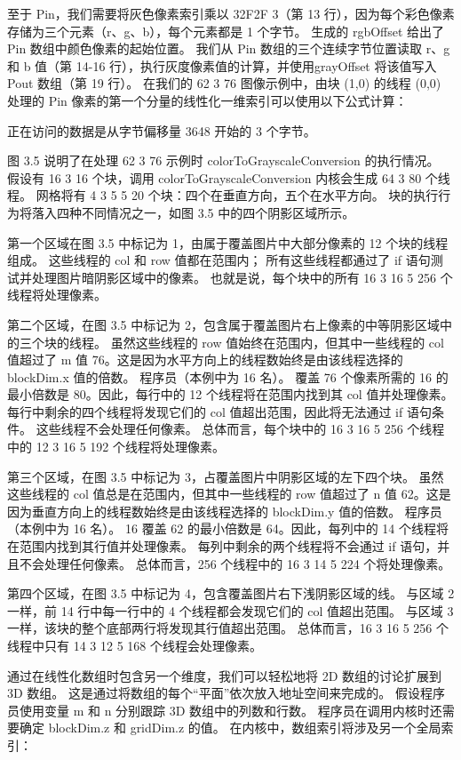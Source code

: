 至于 Pin，我们需要将灰色像素索引乘以 32F2F 3（第 13 行），因为每个彩色像素存储为三个元素（r、g、b），每个元素都是 1 个字节。 生成的 rgbOffset 给出了 Pin 数组中颜色像素的起始位置。 我们从 Pin 数组的三个连续字节位置读取 r、g 和 b 值（第 14-16 行），执行灰度像素值的计算，并使用grayOffset 将该值写入 Pout 数组（第 19 行）。 在我们的 62 3 76 图像示例中，由块 (1,0) 的线程 (0,0) 处理的 Pin 像素的第一个分量的线性化一维索引可以使用以下公式计算：

正在访问的数据是从字节偏移量 3648 开始的 3 个字节。

图 3.5 说明了在处理 62 3 76 示例时 colorToGrayscaleConversion 的执行情况。 假设有 16 3 16 个块，调用 colorToGrayscaleConversion 内核会生成 64 3 80 个线程。 网格将有 4 3 5 5 20 个块：四个在垂直方向，五个在水平方向。 块的执行行为将落入四种不同情况之一，如图 3.5 中的四个阴影区域所示。

第一个区域在图 3.5 中标记为 1，由属于覆盖图片中大部分像素的 12 个块的线程组成。 这些线程的 col 和 row 值都在范围内； 所有这些线程都通过了 if 语句测试并处理图片暗阴影区域中的像素。 也就是说，每个块中的所有 16 3 16 5 256 个线程将处理像素。

第二个区域，在图 3.5 中标记为 2，包含属于覆盖图片右上像素的中等阴影区域中的三个块的线程。 虽然这些线程的 row 值始终在范围内，但其中一些线程的 col 值超过了 m 值 76。这是因为水平方向上的线程数始终是由该线程选择的 blockDim.x 值的倍数。 程序员（本例中为 16 名）。 覆盖 76 个像素所需的 16 的最小倍数是 80。因此，每行中的 12 个线程将在范围内找到其 col 值并处理像素。 每行中剩余的四个线程将发现它们的 col 值超出范围，因此将无法通过 if 语句条件。 这些线程不会处理任何像素。 总体而言，每个块中的 16 3 16 5 256 个线程中的 12 3 16 5 192 个线程将处理像素。

第三个区域，在图 3.5 中标记为 3，占覆盖图片中阴影区域的左下四个块。 虽然这些线程的 col 值总是在范围内，但其中一些线程的 row 值超过了 n 值 62。这是因为垂直方向上的线程数始终是由该线程选择的 blockDim.y 值的倍数。 程序员（本例中为 16 名）。 16 覆盖 62 的最小倍数是 64。因此，每列中的 14 个线程将在范围内找到其行值并处理像素。 每列中剩余的两个线程将不会通过 if 语句，并且不会处理任何像素。 总体而言，256 个线程中的 16 3 14 5 224 个将处理像素。

第四个区域，在图 3.5 中标记为 4，包含覆盖图片右下浅阴影区域的线。 与区域 2 一样，前 14 行中每一行中的 4 个线程都会发现它们的 col 值超出范围。 与区域 3 一样，该块的整个底部两行将发现其行值超出范围。 总体而言，16 3 16 5 256 个线程中只有 14 3 12 5 168 个线程会处理像素。

通过在线性化数组时包含另一个维度，我们可以轻松地将 2D 数组的讨论扩展到 3D 数组。 这是通过将数组的每个“平面”依次放入地址空间来完成的。 假设程序员使用变量 m 和 n 分别跟踪 3D 数组中的列数和行数。 程序员在调用内核时还需要确定 blockDim.z 和 gridDim.z 的值。 在内核中，数组索引将涉及另一个全局索引：

